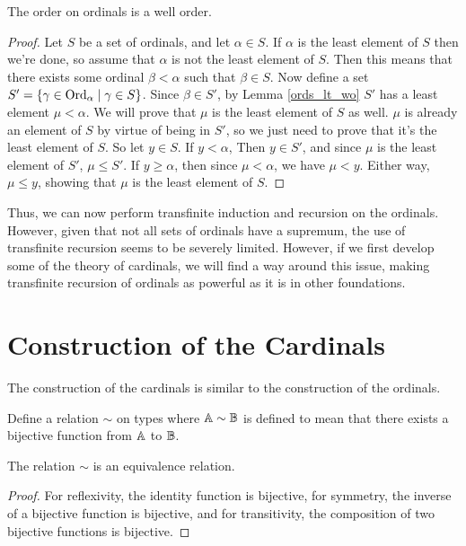 \documentclass[../../math.tex]{subfiles}
\begin{document}
\begin{instance}
    The order on ordinals is a well order.
\end{instance}
\begin{proof}
    Let $S$ be a set of ordinals, and let $\alpha \in S$.  If $\alpha$ is the
    least element of $S$ then we're done, so assume that $\alpha$ is not the
    least element of $S$.  Then this means that there exists some ordinal $\beta
    < \alpha$ such that $\beta \in S$.  Now define a set $S' = \{\gamma \in
    \operatorname{Ord}_\alpha \mid \gamma \in S\}$.  Since $\beta \in S'$, by Lemma
    \ref{ords_lt_wo} $S'$ has a least element $\mu < \alpha$.  We will prove
    that $\mu$ is the least element of $S$ as well.  $\mu$ is already an element
    of $S$ by virtue of being in $S'$, so we just need to prove that it's the
    least element of $S$.  So let $y \in S$.  If $y < \alpha$, Then $y \in S'$,
    and since $\mu$ is the least element of $S'$, $\mu \leq S'$.  If $y \geq
    \alpha$, then since $\mu < \alpha$, we have $\mu < y$.  Either way, $\mu
    \leq y$, showing that $\mu$ is the least element of $S$.
\end{proof}

Thus, we can now perform transfinite induction and recursion on the ordinals.
However, given that not all sets of ordinals have a supremum, the use of
transfinite recursion seems to be severely limited.  However, if we first
develop some of the theory of cardinals, we will find a way around this issue,
making transfinite recursion of ordinals as powerful as it is in other
foundations.

\section{Construction of the Cardinals} \label{card_base}

The construction of the cardinals is similar to the construction of the
ordinals.

\begin{definition}
    Define a relation $\sim$ on types where $\mathbb{A} \sim \mathbb{B}$ is defined to mean that
    there exists a bijective function from $\mathbb{A}$ to $\mathbb{B}$.
\end{definition}

\begin{lemma}
    The relation $\sim$ is an equivalence relation.
\end{lemma}
\begin{proof}
    For reflexivity, the identity function is bijective, for symmetry, the
    inverse of a bijective function is bijective, and for transitivity, the
    composition of two bijective functions is bijective.
\end{proof}
\end{document}
